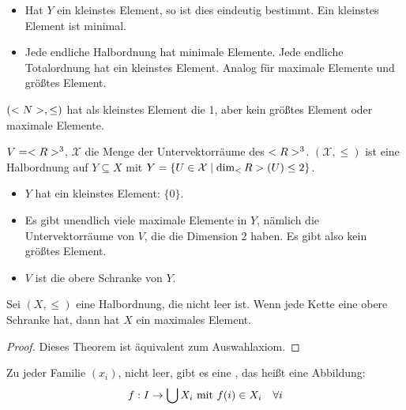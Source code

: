 \begin{remark}
	\begin{itemize}
		\item Hat $Y$ ein kleinstes Element, so ist dies eindeutig bestimmt. Ein kleinstes Element ist minimal.
		\item Jede endliche Halbordnung hat minimale Elemente. Jede endliche Totalordnung hat ein kleinstes Element. Analog für maximale Elemente und größtes Element.
	\end{itemize}
\end{remark}

\begin{example}
	$(<N>,\le)$ hat als kleinstes Element die 1, aber kein größtes Element oder maximale Elemente.
\end{example}

\begin{example}
	$V=<R>^3$, $\mathcal{X}$ die Menge der Untervektorräume des $<R>^3$. $(\mathcal{X},\le)$ ist eine Halbordnung auf $Y\subseteq X$ mit $Y=\{U\in\mathcal{X}\mid \dim_\real(U)\le 2\}$. 
	\begin{itemize}
		\item $Y$ hat ein kleinstes Element: $\{0\}$.
		\item Es gibt unendlich viele maximale Elemente in $Y$, nämlich die Untervektorräume von $V$, die die Dimension 2 haben. Es gibt also kein größtes Element.
		\item $V$ ist die obere Schranke von $Y$.
	\end{itemize}
\end{example}

\begin{theorem}
	Sei $(X,\le)$ eine Halbordnung, die nicht leer ist. Wenn jede Kette eine obere Schranke hat, dann hat $X$ ein maximales Element.
\end{theorem}
\begin{proof}
	Dieses Theorem ist äquivalent zum Auswahlaxiom. \frownie{}
\end{proof}

\begin{conclusion}
	Zu jeder Familie $(x_i)$, nicht leer, gibt es eine , das heißt eine Abbildung:
	\begin{align}
		f: I\to \bigcup X_i\text{ mit } f(i)\in X_i\quad\forall i\notag
	\end{align}
\end{conclusion}
